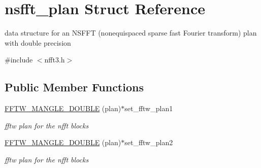 \hypertarget{structnsfft__plan}{\section{nsfft\-\_\-plan Struct Reference}
\label{structnsfft__plan}
}


data structure for an N\-S\-F\-F\-T (nonequispaced sparse fast Fourier transform) plan with double precision  




{\ttfamily \#include $<$nfft3.\-h$>$}

\subsection*{Public Member Functions}
\begin{DoxyCompactItemize}
\item 
\hypertarget{structnsfft__plan_a979134567e97bfffbc022b8267f98f6d}{\hyperlink{structnsfft__plan_a979134567e97bfffbc022b8267f98f6d}{F\-F\-T\-W\-\_\-\-M\-A\-N\-G\-L\-E\-\_\-\-D\-O\-U\-B\-L\-E} (plan)$\ast$set\-\_\-fftw\-\_\-plan1}\label{structnsfft__plan_a979134567e97bfffbc022b8267f98f6d}

\begin{DoxyCompactList}\small\item\em fftw plan for the nfft blocks \end{DoxyCompactList}\item 
\hypertarget{structnsfft__plan_a937d2895eeeaa8aabb92359232498693}{\hyperlink{structnsfft__plan_a937d2895eeeaa8aabb92359232498693}{F\-F\-T\-W\-\_\-\-M\-A\-N\-G\-L\-E\-\_\-\-D\-O\-U\-B\-L\-E} (plan)$\ast$set\-\_\-fftw\-\_\-plan2}\label{structnsfft__plan_a937d2895eeeaa8aabb92359232498693}

\begin{DoxyCompactList}\small\item\em fftw plan for the nfft blocks \end{DoxyCompactList}\end{DoxyCompactItemize}
